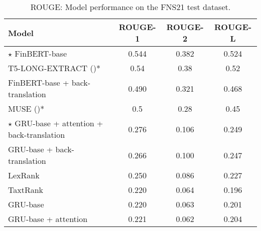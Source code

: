 \begin{table}[ht]
    \centering
    \begin{tabular}{lccc}
        \toprule
        \textbf{Model} & \textbf{ROUGE-1} & \textbf{ROUGE-2} & \textbf{ROUGE-L} \\
        \midrule
            $\star$ FinBERT-base & 0.544 & 0.382 & 0.524 \\
            T5-LONG-EXTRACT (\cite{orzhenovskii-2021-t5})* & 0.54 & 0.38 & 0.52 \\
            FinBERT-base + back-translation & 0.490 & 0.321 & 0.468 \\
            MUSE (\cite{litvak-last-2013-multilingual})* & 0.5 & 0.28 & 0.45 \\
            $\star$ GRU-base + attention + back-translation & 0.276 & 0.106 & 0.249 \\
            GRU-base + back-translation & 0.266 & 0.100 & 0.247 \\
            LexRank & 0.250 & 0.086 & 0.227 \\
            TaxtRank & 0.220 & 0.064 & 0.196 \\
            GRU-base & 0.220 & 0.063 & 0.201 \\
            GRU-base + attention & 0.221 & 0.062 & 0.204 \\
        \bottomrule
    \end{tabular}\caption{ROUGE: Model performance on the FNS21 test dataset.}
    \label{tab:rouge_performance}
\end{table}

